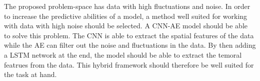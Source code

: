 

The proposed problem-space has data with high fluctuations and noise.
In order to increase the predictive abilities of a model, a method well suited for working with data with high noise should be selected.
A CNN-AE model should be able to solve this problem.
The CNN is able to extract the spatial features of the data while the AE can filter out the noise and fluctuations in the data.
By then adding a LSTM network at the end, the model should be able to extract the temoral featrues from the data.
This hybrid framework should therefore be well suited for the task at hand.




